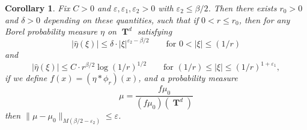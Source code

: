 \documentclass[12pt,reqno]{article}
\numberwithin{equation}{section}
\DeclareMathOperator{\TT}{\mathbf{T}}
\newtheorem{corollary}[theorem]{Corollary}
\numberwithin{theorem}{section}
\begin{document}
\begin{corollary} \label{lemmaIOJDD23124}
    Fix $C > 0$ and $\varepsilon,\varepsilon_1,\varepsilon_2 > 0$ with $\varepsilon_2 \leq \beta/2$. Then there exists $r_0 > 0$ and $\delta > 0$ depending on these quantities, such that if $0 < r \leq r_0$, then for any Borel probability measure $\eta$ on $\TT^d$ satisfying
    \begin{equation} \label{equationADOIJWAOIDJAD}
        \left| \widehat{\eta}(\xi) \right| \leq \delta \cdot |\xi|^{\varepsilon_2-\beta/2}\quad\quad\text{for $0 < |\xi| \leq (1/r)$}
    \end{equation}
    and
    \begin{equation} \label{equationIAOIDJAOICJOIBJOIEVJ2}
        \left| \widehat{\eta}(\xi) \right| \leq C \cdot r^{\beta/2} \log(1/r)^{1/2} \quad\quad\text{for $(1/r) \leq |\xi| \leq (1/r)^{1 + \varepsilon_1}$},
    \end{equation}
    if we define $f(x) = (\eta * \phi_r)(x)$, and a probability measure
    \[ \mu = \frac{f \mu_0}{(f \mu_0)(\TT^d)} \]
    then $\| \mu - \mu_0 \|_{M(\beta/2-\varepsilon_2)} \leq \varepsilon$.
\end{corollary}
\end{document}
